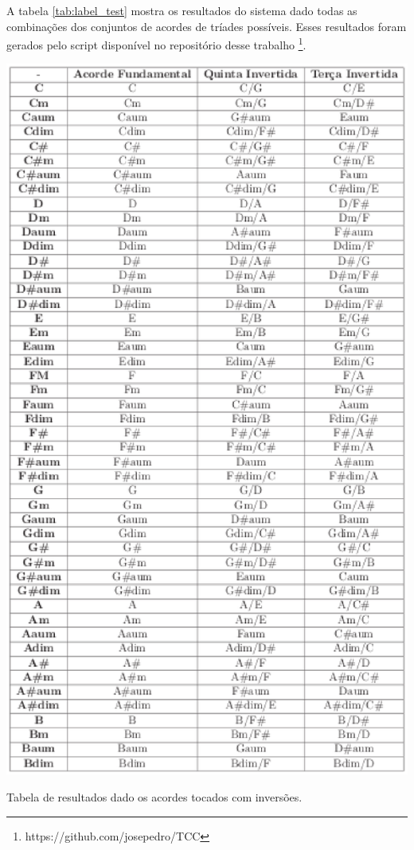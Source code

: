 A tabela \ref{tab:label_test} mostra os resultados do sistema dado todas as combinações dos conjuntos de acordes de tríades possíveis. Esses resultados foram gerados pelo script disponível no repositório desse trabalho \footnote{https://github.com/josepedro/TCC}.

\begin{table}[h]
  \centering
  \includegraphics[keepaspectratio=true,scale=0.8]{figuras/tabela_acordes_completos.eps}
  \caption{Tabela de resultados dado os acordes tocados com inversões.}
  \label{tab:label_test}
\end{table}

